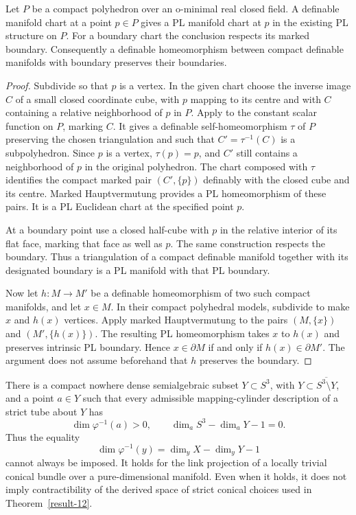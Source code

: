 \begin{lemma}
\label{lem:tube-marked-compact-charts}
Let $P$ be a compact polyhedron over an o-minimal real closed field.
A definable manifold chart at a point $p\in P$ gives a PL manifold
chart at $p$ in the existing PL structure on $P$.
For a boundary chart the conclusion respects its marked boundary.
Consequently a definable homeomorphism between compact definable
manifolds with boundary preserves their boundaries.
\end{lemma}
\begin{proof}
Subdivide so that $p$ is a vertex.  In the given chart choose the
inverse image $C$ of a small closed coordinate cube, with $p$ mapping
to its centre and with $C$ containing a relative neighborhood of $p$
in $P$.  Apply \cite[Theorem~2.2(1)--(2), author p.~6]{Shiota2010}
to the constant scalar function on $P$, marking $C$.
It gives a definable self-homeomorphism $\tau$ of $P$ preserving the
chosen triangulation and such that $C'=\tau^{-1}(C)$ is a
subpolyhedron.  Since $p$ is a vertex, $\tau(p)=p$, and $C'$ still
contains a neighborhood of $p$ in the original polyhedron.
The chart composed with $\tau$ identifies the compact marked pair
$(C',\{p\})$ definably with the closed cube and its centre.
Marked Hauptvermutung
\cite[Theorem~2.1, author p.~5]{Shiota2010}
provides a PL homeomorphism of these pairs.  It is a PL Euclidean
chart at the specified point $p$.

At a boundary point use a closed half-cube with $p$ in the relative
interior of its flat face, marking that face as well as $p$.
The same construction respects the boundary.  Thus a triangulation
of a compact definable manifold together with its designated boundary
is a PL manifold with that PL boundary.

Now let $h:M\to M'$ be a definable homeomorphism of two such compact
manifolds, and let $x\in M$.  In their compact polyhedral models,
subdivide to make $x$ and $h(x)$ vertices.  Apply marked
Hauptvermutung to the pairs $(M,\{x\})$ and $(M',\{h(x)\})$.
The resulting PL homeomorphism takes $x$ to $h(x)$ and preserves
intrinsic PL boundary.  Hence $x\in\partial M$ if and only if
$h(x)\in\partial M'$.  The argument does not assume beforehand
that $h$ preserves the boundary.
\end{proof}


\begin{theorem}\label{thm:tube-fibre-dimension-obstruction}
There is a compact nowhere dense semialgebraic subset $Y\subset S^3$,
with $Y\subset\overline{S^3\setminus Y}$, and a point $a\in Y$ such
that every admissible mapping-cylinder description of a strict tube
about $Y$ has
\[
 \dim\varphi^{-1}(a)>0,
 \qquad
 \dim_a S^3-\dim_aY-1=0.
\]
Thus the equality
\begin{equation}\label{eq:tube-fibre-dimension}
 \dim\varphi^{-1}(y)=\dim_yX-\dim_yY-1
\end{equation}
cannot always be imposed.  It holds for the link projection of a
locally trivial conical bundle over a pure-dimensional manifold.
Even when it holds, it does not imply contractibility of the derived
space of strict conical choices used in Theorem~\ref{result-12}.
\end{theorem}

